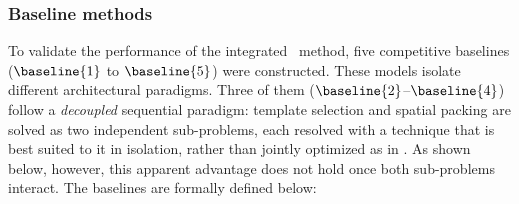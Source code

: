\subsubsection{Baseline methods}
\label{subsubsec:baselines}

To validate the performance of the integrated \methodNameUniform\ method, five competitive baselines ($\baseline{1}$ to $\baseline{5}$) were constructed. These models isolate different architectural paradigms. Three of them ($\baseline{2}$--$\baseline{4}$) follow a \emph{decoupled} sequential paradigm: template selection and spatial packing are solved as two independent sub-problems, each resolved with a technique that is best suited to it in isolation, rather than jointly optimized as in \methodNameGeneral. As shown below, however, this apparent advantage does not hold once both sub-problems interact. The baselines are formally defined below:
